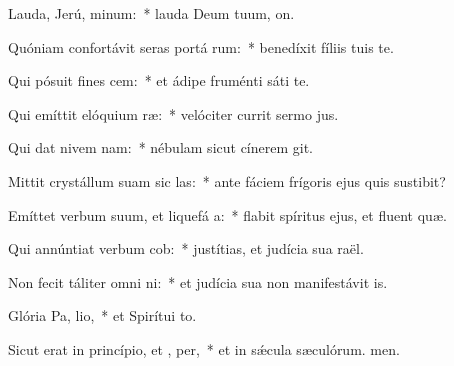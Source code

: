 \item Lauda, Jerú, minum:~* lauda Deum tuum, on.
\item Quóniam confortávit seras portá rum:~* benedíxit fíliis tuis  te.
\item Qui pósuit fines  cem:~* et ádipe fruménti sáti te.
\item Qui emíttit elóquium  ræ:~* velóciter currit sermo jus.
\item Qui dat nivem  nam:~* nébulam sicut cínerem git.
\item Mittit crystállum suam sic las:~* ante fáciem frígoris ejus quis sustibit?
\item Emíttet verbum suum, et liquefá a:~* flabit spíritus ejus, et fluent quæ.
\item Qui annúntiat verbum  cob:~* justítias, et judícia sua raël.
\item Non fecit táliter omni ni:~* et judícia sua non manifestávit is.
\item Glória Pa,  lio,~* et Spirítui to.
\item Sicut erat in princípio, et ,  per,~* et in sǽcula sæculórum. men.
